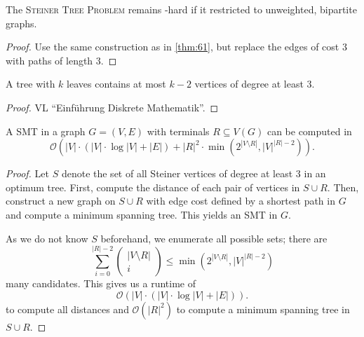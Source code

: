 \documentclass[../skript.tex]{subfiles}
\begin{document}
\begin{theorem} %
\label{thm:62}
The \textsc{Steiner Tree Problem} remains \NP-hard if it restricted to unweighted, bipartite graphs.
\end{theorem}
\begin{proof}
Use the same construction as in \cref{thm:61}, but replace the edges of cost $3$ with paths of length $3$.
\end{proof}
\begin{proposition} %
\label{prop:63}
A tree with $k$ leaves contains at most $k-2$ vertices of degree at least 3.
\end{proposition}
\begin{proof}
VL ``Einführung Diskrete Mathematik''.
\end{proof}
\begin{theorem} %
\label{thm:64}
A \acl{SMT} in a graph $G = (V, E)$ with terminals $R \subseteq V(G)$ can be computed in
\[
	\mathcal{O} \left( |V| \cdot (|V| \cdot \log |V| + |E|) + |R|^2 \cdot \min \left( 2^{|V\setminus R|}, |V|^{|R| - 2} \right) \right).
\]
\end{theorem}
\begin{proof}
Let $S$ denote the set of all Steiner vertices of degree at least 3 in an optimum tree. First, compute the distance of each pair of vertices in $S \cup R$. Then, construct a new graph on $S \cup R$ with edge cost defined by a shortest path in $G$ and compute a minimum spanning tree. This yields an \ac{SMT} in $G$.

As we do not know $S$ beforehand, we enumerate all possible sets; there are
\[
	\sum_{i=0}^{|R| - 2} \begin{pmatrix}
		|V\setminus R| \\ i
	\end{pmatrix} \leq \min \left( 2^{|V\setminus R|}, |V|^{|R|-2} \right)
\]
many candidates.
This gives us a runtime of
\[
	\mathcal{O} (|V| \cdot (|V| \cdot \log |V| + |E|)).
\]
to compute all distances and $\mathcal{O}(|R|^2)$ to compute a minimum spanning tree in $S \cup R$.
\end{proof}
\end{document}
